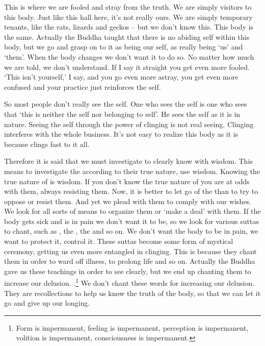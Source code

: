 This is where we are fooled and stray from the truth. We are simply visitors to this body. Just like this hall here, it's not really ours. We are simply temporary tenants, like the rats, lizards and geckos -- but we don't know this. This body is the same. Actually the Buddha taught that there is no abiding self within this body, but we go and grasp on to it as being our self, as really being `us' and `them'. When the body changes we don't want it to do so. No matter how much we are told, we don't understand. If I say it straight you get even more fooled. `This isn't yourself,' I say, and you go even more astray, you get even more confused and your practice just reinforces the self. 

So most people don't really see the self. One who sees the self is one who sees that `this is neither the self nor belonging to self'. He sees the self as it is in nature. Seeing the self through the power of clinging is not real seeing. Clinging interferes with the whole business. It's not easy to realize this body as it is because  clings fast to it all. 

Therefore it is said that we must investigate to clearly know with wisdom. This means to investigate the  according to their true nature, use wisdom. Knowing the true nature of  is wisdom. If you don't know the true nature of  you are at odds with them, always resisting them. Now, it is better to let go of the  than to try to oppose or resist them. And yet we plead with them to comply with our wishes. We look for all sorts of means to organize them or `make a deal' with them. If the body gets sick and is in pain we don't want it to be, so we look for various suttas to chant, such as , the , the  and so on. We don't want the body to be in pain, we want to protect it, control it. These suttas become some form of mystical ceremony, getting us even more entangled in clinging. This is because they chant them in order to ward off illness, to prolong life and so on. Actually the Buddha gave us these teachings in order to see clearly, but we end up chanting them to increase our delusion. .\footnote{Form is impermanent, feeling is impermanent, perception is impermanent, volition is impermanent, consciousness is impermanent.} We don't chant these words for increasing our delusion. They are recollections to help us know the truth of the body, so that we can let it go and give up our longing. 

